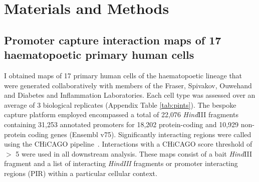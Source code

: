 \documentclass[a4paper,11pt]{report}
\begin{document}





\chapter{Materials and Methods}

\section{Promoter capture interaction maps of 17 haematopoetic primary human cells}
I obtained maps of 17 primary human cells of the haematopoetic lineage that were generated collaboratively with members of the Fraser, Spivakov, Ouwehand and Diabetes and Inflammation Laboratories. Each cell type was assessed over an average of 3 biological replicates (Appendix Table \ref{tab:pints}). The bespoke capture platform employed encompassed a total of 22,076 \textit{Hind}III fragments containing 31,253 annotated promoters for 18,202 protein-coding and 10,929 non-protein coding genes (Ensembl v75). Significantly interacting regions were called using the CHiCAGO pipeline~\citep{CairnsFreire-PritchettWingettEtAl2016}. Interactions with a CHiCAGO score threshold of $>$ 5 were used in all downstream analysis. These maps consist of a bait \textit{Hind}III fragment and a list of interacting \textit{HindIII} fragments or promoter interacting regions (PIR) within a particular cellular context.
\end{document}
